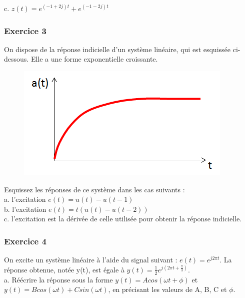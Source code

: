 	c. $z(t) = e^{(-1+2j)t}+e^{(-1-2j)t}$
	
	\vspace{1\baselineskip} 
	
	
	
	\subsubsection{Exercice 3}
	
	On dispose de la réponse indicielle d'un système linéaire, qui est esquissée ci-dessous. Elle a une forme exponentielle croissante.\\
	
	\begin{figure}[h!]
		\centering
		\includegraphics[scale=0.5]{images/Exo_2_3.png} 
	\end{figure} 
	
	Esquissez les réponses de ce système dans les cas suivants :\\
	
	a. l'excitation $e(t)=u(t)-u(t-1)$\\
	
	b. l'excitation $e(t)=t(u(t)-u(t-2))$\\
	
	c. l'excitation est la dérivée de celle utilisée pour obtenir la réponse indicielle.\\
	
	\subsubsection{Exercice 4}
	
	On excite un système linéaire à l'aide du signal suivant : $e(t)=e^{j2\pi t}$. La réponse obtenue, notée y(t), est égale à $y(t)=\frac{1}{2}e^{j(2\pi t+\frac{\pi}{3})}$.\\
	
	a. Réécrire la réponse sous la forme $y(t)=Acos(\omega t + \phi)$ et $y(t)=Bcos(\omega t)+Csin(\omega t)$, en précisant les valeurs de A, B, C et $\phi$.\\
	
